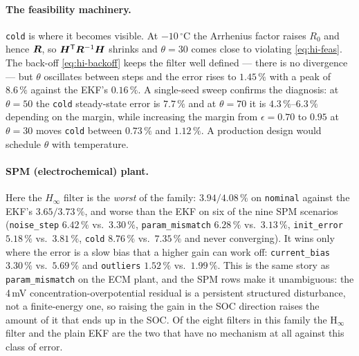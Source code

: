 \paragraph{The feasibility machinery.}  \texttt{cold} is where it becomes visible.  At
$-10$\,\ensuremath{{}^\circ}C the Arrhenius factor raises $R_0$ and hence $\bm{R}$, so
$\bm{H}^{\mathsf{T}}\bm{R}^{-1}\bm{H}$ shrinks and $\theta=30$ comes close to violating \eqref{eq:hi-feas}.  The
back-off \eqref{eq:hi-backoff} keeps the filter well defined --- there is no divergence --- but
$\theta$ oscillates between steps and the error rises to $1.45\,\%$ with a peak of $8.6\,\%$
against the EKF's $0.16\,\%$.  A single-seed sweep confirms the diagnosis: at $\theta=50$ the
\texttt{cold} steady-state error is $7.7\,\%$ and at $\theta=70$ it is $4.3\,\%$--$6.3\,\%$
depending on the margin, while increasing the margin from $\epsilon=0.70$ to $0.95$ at
$\theta=30$ moves \texttt{cold} between $0.73\,\%$ and $1.12\,\%$.  A production design would
schedule $\theta$ with temperature.

\paragraph{SPM (electrochemical) plant.}  Here the $H_\infty$ filter is the \emph{worst} of the
family: $3.94/4.08\,\%$ on \texttt{nominal} against the EKF's $3.65/3.73\,\%$, and worse than the
EKF on six of the nine SPM scenarios (\texttt{noise\_step} $6.42\,\%$ vs.\ $3.30\,\%$,
\texttt{param\_mismatch} $6.28\,\%$ vs.\ $3.13\,\%$, \texttt{init\_error} $5.18\,\%$ vs.\
$3.81\,\%$, \texttt{cold} $8.76\,\%$ vs.\ $7.35\,\%$ and never converging).  It wins only where the
error is a slow bias that a higher gain can work off: \texttt{current\_bias} $3.30\,\%$ vs.\
$5.69\,\%$ and \texttt{outliers} $1.52\,\%$ vs.\ $1.99\,\%$.  This is the same story as
\texttt{param\_mismatch} on the ECM plant, and the SPM rows make it unambiguous: the 4\,mV
concentration-overpotential residual is a persistent structured disturbance, not a finite-energy
one, so raising the gain in the SOC direction raises the amount of it that ends up in the SOC.
Of the eight filters in this family the H$_\infty$ filter and the plain EKF are the two that have
no mechanism at all against this class of error.


